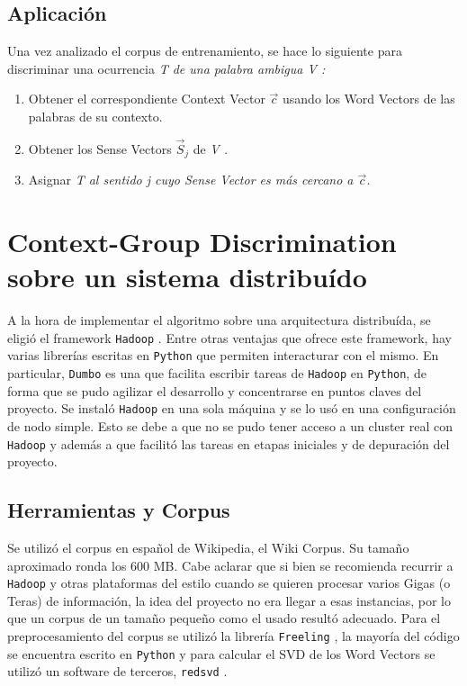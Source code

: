 \documentclass[11pt]{article}
\begin{document}
\subsection{Aplicación}
Una vez analizado el corpus de entrenamiento, se hace lo siguiente para discriminar una ocurrencia \em T \em de una palabra ambigua \em V \em:
\begin{enumerate}
\item Obtener el correspondiente Context Vector $\vec c$ usando los Word Vectors de las palabras de su contexto.
\item Obtener los Sense Vectors $\vec S_j$ de \em V \em.
\item Asignar \em T \em al sentido \em j \em cuyo Sense Vector es más cercano a $\vec c$.
\end{enumerate}

\section{Context-Group Discrimination sobre un sistema distribuído}
A la hora de implementar el algoritmo sobre una arquitectura distribuída, se eligió el framework \texttt{Hadoop} \cite{Had}.
Entre otras ventajas que ofrece este framework, hay varias librerías escritas en \texttt{Python} que permiten interacturar con el mismo. En particular, \texttt{Dumbo} \cite{Dum} es una que facilita escribir tareas de \texttt{Hadoop} en \texttt{Python}, de forma que se pudo agilizar el desarrollo y concentrarse en puntos claves del proyecto.
Se instaló \texttt{Hadoop} en una sola máquina y se lo usó en una configuración de nodo simple. Esto se debe a que no se pudo tener acceso a un cluster real con \texttt{Hadoop} y además a que facilitó las tareas en etapas iniciales y de depuración del proyecto.
\subsection{Herramientas y Corpus}
Se utilizó el corpus en español de Wikipedia, el Wiki Corpus. Su tamaño aproximado ronda los 600 MB.
Cabe aclarar que si bien se recomienda recurrir a \texttt{Hadoop} y otras plataformas del estilo cuando se quieren procesar varios Gigas (o Teras) de información, la idea del proyecto no era llegar a esas instancias, por lo que un corpus de un tamaño pequeño como el usado resultó adecuado.
Para el preprocesamiento del corpus se utilizó la librería \texttt{Freeling} \cite{Free}, la mayoría del código se encuentra escrito en \texttt{Python} y para calcular el SVD de los Word Vectors se utilizó un software de terceros, \texttt{redsvd} \cite{Red}.
\end{document}
